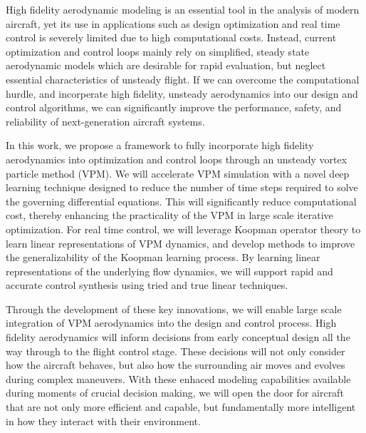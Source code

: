 \documentclass[12pt, letterpaper]{article}
\begin{document}



High fidelity aerodynamic modeling is an essential tool in the analysis of modern aircraft, yet its use in applications such as design optimization and real time control is severely limited due to high computational costs.  Instead, current optimization and control loops mainly rely on simplified, steady state aerodynamic models which are desirable for rapid evaluation, but neglect essential characteristics of unsteady flight. If we can overcome the computational hurdle, and incorperate high fidelity, unsteady aerodynamics into our design and control algorithms, we can significantly improve the performance, safety, and reliability of next-generation aircraft systems. 

In this work, we propose a framework to fully incorporate high fidelity aerodynamics into optimization and control loops through an unsteady vortex particle method (VPM).  We will accelerate VPM simulation with a novel deep learning technique designed to reduce the number of time steps required to solve the governing differential equations.  This will significantly reduce computational cost, thereby enhancing the practicality of the VPM in large scale iterative optimization.  For real time control, we will leverage Koopman operator theory to learn linear representations of VPM dynamics, and develop methods to improve the generalizability of the Koopman learning process.  By learning linear representations of the underlying flow dynamics, we will support rapid and accurate control synthesis using tried and true linear techniques.

Through the development of these key innovations, we will enable large scale integration of VPM aerodynamics into the design and control process.  High fidelity aerodynamics will inform decisions from early conceptual design all the way through to the flight control stage.  These decisions will not only consider how the aircraft behaves, but also how the surrounding air moves and evolves during complex maneuvers.  With these enhaced modeling capabilities available during moments of crucial decision making, we will open the door for aircraft that are not only more efficient and capable, but fundamentally more intelligent in how they interact with their environment. 
\end{document}
